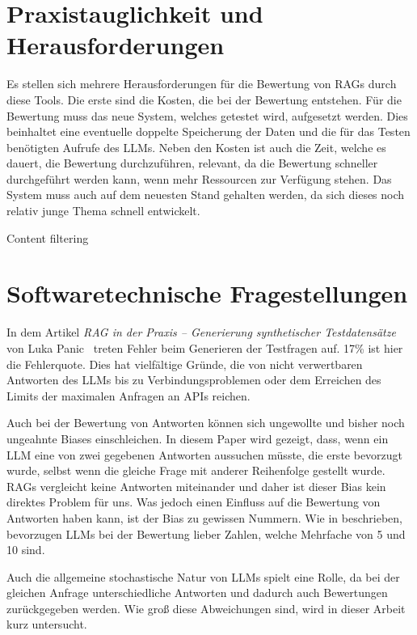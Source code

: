 \section{Praxistauglichkeit und Herausforderungen}
Es stellen sich mehrere Herausforderungen für die Bewertung von RAGs durch diese Tools.
Die erste sind die Kosten, die bei der Bewertung entstehen. Für die Bewertung muss das neue System, welches getestet wird, aufgesetzt werden.
Dies beinhaltet eine eventuelle doppelte Speicherung der Daten und die für das Testen benötigten Aufrufe des LLMs.
Neben den Kosten ist auch die Zeit, welche es dauert, die Bewertung durchzuführen, relevant, da die Bewertung schneller durchgeführt werden kann, wenn mehr Ressourcen zur Verfügung stehen.
Das System muss auch auf dem neuesten Stand gehalten werden, da sich dieses noch relativ junge Thema schnell entwickelt.

Content filtering

\section{Softwaretechnische Fragestellungen}

In dem Artikel \textit{RAG in der Praxis – Generierung synthetischer Testdatensätze} von Luka Panic~\cite{pixion2024rag} treten Fehler beim Generieren der Testfragen auf. 17\% ist hier die Fehlerquote.
Dies hat vielfältige Gründe, die von nicht verwertbaren Antworten des LLMs bis zu Verbindungsproblemen oder dem Erreichen des Limits der maximalen Anfragen an APIs reichen.

Auch bei der Bewertung von Antworten können sich ungewollte und bisher noch ungeahnte Biases einschleichen. In diesem Paper \cite{yang2023llmfairness} wird gezeigt, dass, wenn ein LLM eine von zwei gegebenen Antworten aussuchen müsste, die erste bevorzugt wurde, selbst wenn die gleiche Frage mit anderer Reihenfolge gestellt wurde.
RAGs vergleicht keine Antworten miteinander und daher ist dieser Bias kein direktes Problem für uns. Was jedoch einen Einfluss auf die Bewertung von Antworten haben kann, ist der Bias zu gewissen Nummern.
Wie in \cite{shaikh2024cbeval} beschrieben, bevorzugen LLMs bei der Bewertung lieber Zahlen, welche Mehrfache von 5 und 10 sind.

Auch die allgemeine stochastische Natur von LLMs spielt eine Rolle, da bei der gleichen Anfrage unterschiedliche Antworten und dadurch auch Bewertungen zurückgegeben werden. Wie groß diese Abweichungen sind, wird in dieser Arbeit kurz untersucht.

